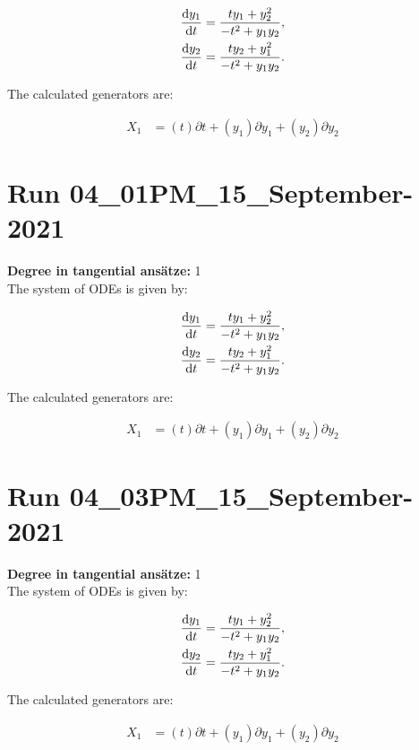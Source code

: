 \begin{align*}
\dv{y_{1}}{t}&=\frac{t y_{1} + y_{2}^{2}}{- t^{2} + y_{1} y_{2}},\\
\dv{y_{2}}{t}&=\frac{t y_{2} + y_{1}^{2}}{- t^{2} + y_{1} y_{2}}.\\
\end{align*}

\noindent The calculated generators are:

\begin{align*}
X_{1}&=\left( t \right)\partial t+\left( y_{1} \right)\partial y_{1}+\left( y_{2} \right)\partial y_{2}\end{align*}
\section*{Run 04\_01PM\_15\_September-2021}
\textbf{Degree in tangential ansätze:}	1\\
The system of ODEs is given by:

\begin{align*}
\dv{y_{1}}{t}&=\frac{t y_{1} + y_{2}^{2}}{- t^{2} + y_{1} y_{2}},\\
\dv{y_{2}}{t}&=\frac{t y_{2} + y_{1}^{2}}{- t^{2} + y_{1} y_{2}}.\\
\end{align*}

\noindent The calculated generators are:

\begin{align*}
X_{1}&=\left( t \right)\partial t+\left( y_{1} \right)\partial y_{1}+\left( y_{2} \right)\partial y_{2}\end{align*}
\section*{Run 04\_03PM\_15\_September-2021}
\textbf{Degree in tangential ansätze:}	1\\
The system of ODEs is given by:

\begin{align*}
\dv{y_{1}}{t}&=\frac{t y_{1} + y_{2}^{2}}{- t^{2} + y_{1} y_{2}},\\
\dv{y_{2}}{t}&=\frac{t y_{2} + y_{1}^{2}}{- t^{2} + y_{1} y_{2}}.\\
\end{align*}

\noindent The calculated generators are:

\begin{align*}
X_{1}&=\left( t \right)\partial t+\left( y_{1} \right)\partial y_{1}+\left( y_{2} \right)\partial y_{2}\end{align*}
